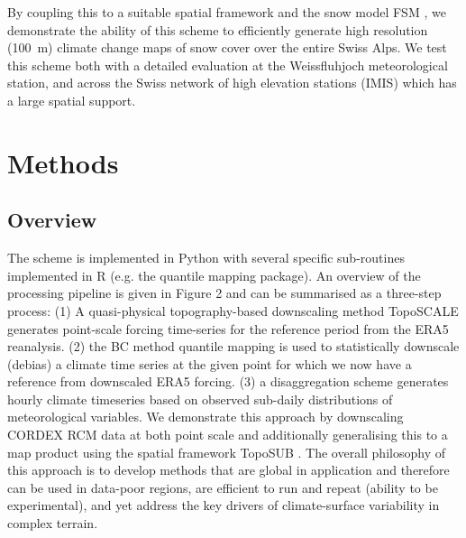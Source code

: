 \documentclass[hess, manuscript]{copernicus}
\begin{document}
By coupling this to a suitable spatial framework \citep{Fiddes2012-td} and the snow model FSM \cite{Essery2015-jv}, we demonstrate the ability of this scheme to efficiently generate high resolution (100~m) climate change maps of snow cover over the entire Swiss Alps. We test this scheme both with a detailed evaluation at the Weissfluhjoch meteorological station, and across the Swiss network of high elevation stations (IMIS) which has a large spatial support. %




\section{Methods}

\subsection{Overview}
The scheme is implemented in Python with several specific sub-routines implemented in R (e.g. the quantile mapping package). An overview of the processing pipeline is given in Figure 2 and can be summarised as a three-step process: (1) A quasi-physical topography-based downscaling method TopoSCALE \citep{Fiddes2014-wt} generates point-scale forcing time-series for the reference period from the ERA5 reanalysis. 
(2) the BC method quantile mapping \citep{Gudmundsson2012-kn} is used to statistically downscale (debias) a climate time series at the given point for which we now have a reference from downscaled ERA5 forcing. (3) a disaggregation scheme \citep{Forster2016-xx} generates hourly climate timeseries based on observed sub-daily distributions of meteorological variables. We demonstrate this approach by downscaling CORDEX RCM data at both point scale and additionally generalising this to a map product using the spatial framework TopoSUB \citep{Fiddes2012-td}. The overall philosophy of this approach is to develop methods that are global in application and therefore can be used in data-poor regions, are efficient to run and repeat (ability to be experimental), and yet address the key drivers of climate-surface variability in complex terrain.
\end{document}
